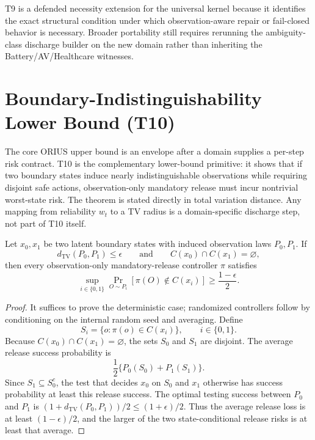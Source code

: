 T9 is a defended necessity extension for the universal kernel because it
identifies the exact structural condition under which observation-aware repair
or fail-closed behavior is necessary. Broader portability still requires
rerunning the ambiguity-class discharge builder on the new domain rather than
inheriting the Battery/AV/Healthcare witnesses.

\section{Boundary-Indistinguishability Lower Bound (T10)}
\label{sec:t10-lower-bound}

The core ORIUS upper bound is an envelope after a domain supplies a
per-step risk contract. T10 is the complementary lower-bound primitive: it
shows that if two boundary states induce nearly indistinguishable observations
while requiring disjoint safe actions, observation-only mandatory release must
incur nontrivial worst-state risk. The theorem is stated directly in total
variation distance. Any mapping from reliability \(w_t\) to a TV radius is a
domain-specific discharge step, not part of T10 itself.

\begin{theorem}
\label{thm:information-theoretic-lower-bound}
Let \(x_0,x_1\) be two latent boundary states with induced observation laws
\(P_0,P_1\). If
\[
  d_{\mathrm{TV}}(P_0,P_1)\le\epsilon
  \qquad\text{and}\qquad
  C(x_0)\cap C(x_1)=\varnothing,
\]
then every observation-only mandatory-release controller \(\pi\) satisfies
\[
  \sup_{i\in\{0,1\}}
  \Pr_{O\sim P_i}\!\left[\pi(O)\notin C(x_i)\right]
  \ge
  \frac{1-\epsilon}{2}.
\]
\end{theorem}

\begin{proof}
It suffices to prove the deterministic case; randomized controllers follow by
conditioning on the internal random seed and averaging. Define
\[
  S_i=\{o:\pi(o)\in C(x_i)\},\qquad i\in\{0,1\}.
\]
Because \(C(x_0)\cap C(x_1)=\varnothing\), the sets \(S_0\) and \(S_1\) are
disjoint. The average release success probability is
\[
  \frac12\{P_0(S_0)+P_1(S_1)\}.
\]
Since \(S_1\subseteq S_0^c\), the test that decides \(x_0\) on \(S_0\) and
\(x_1\) otherwise has success probability at least this release success. The
optimal testing success between \(P_0\) and \(P_1\) is
\((1+d_{\mathrm{TV}}(P_0,P_1))/2\le(1+\epsilon)/2\). Thus the average release
loss is at least \((1-\epsilon)/2\), and the larger of the two state-conditional
release risks is at least that average.
\end{proof}

